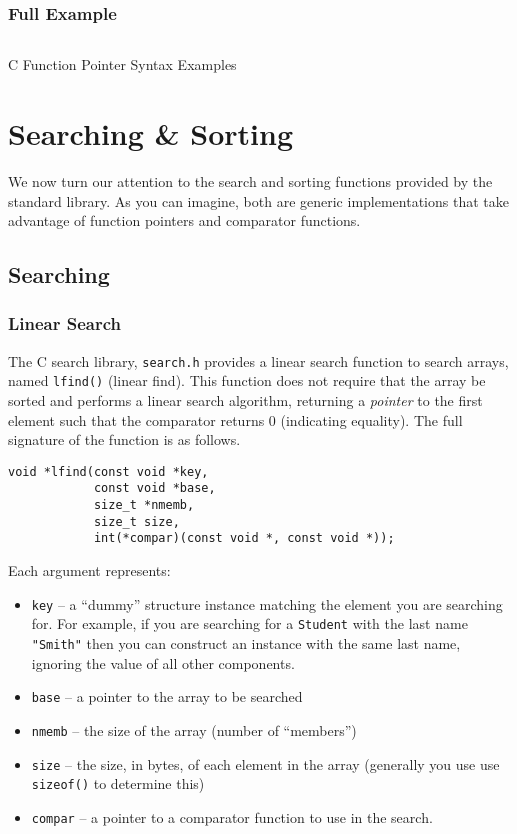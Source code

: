 \subsubsection{Full Example}

\begin{listing}[H]
\inputminted[fontsize=\scriptsize]{c}{code/functionPointers.c}
\caption{C Function Pointer Syntax Examples}
\label{code:c:moreFunctionPointerSyntax}
\end{listing}

\section{Searching \& Sorting}

We now turn our attention to the search and sorting functions provided by
the standard library.  As you can imagine, both are generic implementations
that take advantage of function pointers and comparator functions.

\subsection{Searching}

\subsubsection{Linear Search}

The C search library, \texttt{search.h} provides a linear search 
function to search arrays, named \texttt{lfind()} (linear find).  This
function does not require that the array be sorted and performs a linear
search algorithm, returning a \emph{pointer} to the first element such that
the comparator returns 0 (indicating equality).  The full signature of the
function is as follows.

\begin{verbatim}
void *lfind(const void *key, 
            const void *base, 
            size_t *nmemb, 
            size_t size, 
            int(*compar)(const void *, const void *));
\end{verbatim}

Each argument represents:
\begin{itemize}
  \item \texttt{key} -- a ``dummy'' structure instance matching the
    element you are searching for.  For example, if you are searching for a
    \texttt{Student} with the last name \texttt{"Smith"} then
    you can construct an instance with the same last name, ignoring the value
    of all other components.  
  \item \texttt{base} -- a pointer to the array to be searched
  \item \texttt{nmemb} -- the size of the array (number of ``members'')
  \item \texttt{size} -- the size, in bytes, of each element in the array
   	(generally you use use \texttt{sizeof()} to determine this)
  \item \texttt{compar} -- a pointer to a comparator function to use
    in the search.
\end{itemize}

